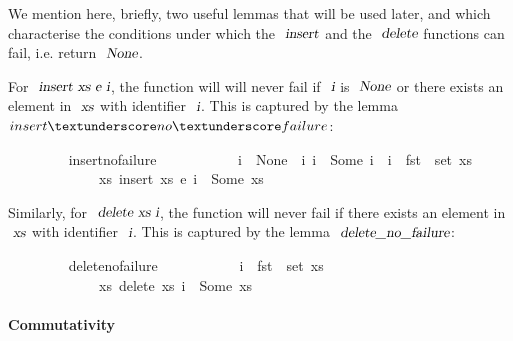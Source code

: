 \documentclass[acmlarge,review,anonymous]{acmart}\settopmatter{printfolios=true}
\begin{document}
We mention here, briefly, two useful lemmas that will be used later, and which characterise the conditions under which the $\isa{insert}$ and the $\isa{delete}$ functions can fail, i.e. return $\isa{None}$.

For $\isa{insert\ xs\ e\ i}$, the function will will never fail if $\isa{i}$ is $\isa{None}$ or there exists an element in $\isa{xs}$ with identifier $\isa{i}$.
This is captured by the lemma $insert{\isacharunderscore}no{\isacharunderscore}failure$:
\\
\begin{isabellebody}
\ \ \ \ \ \ \ \  insert{\isacharunderscore}no{\isacharunderscore}failure{\isacharcolon}\isanewline
\ \ \ \ \ \ \ \ \ \ \ {\isachardoublequoteopen}i\ {\isacharequal}\ None\ {\isasymor}\ {\isacharparenleft}{\isasymexists}i{\isacharprime}{\isachardot}\ i\ {\isacharequal}\ Some\ i{\isacharprime}\ {\isasymand}\ i{\isacharprime}\ {\isasymin}\ fst\ {\isacharbackquote}\ set\ xs{\isacharparenright}{\isachardoublequoteclose}\isanewline
\ \ \ \ \ \ \ \ \ \ \ \ \ {\isachardoublequoteopen}{\isasymexists}xs{\isacharprime}{\isachardot}\ insert\ xs\ e\ i\ {\isacharequal}\ Some\ xs{\isacharprime}{\isachardoublequoteclose}
\end{isabellebody}
\vspace{\baselineskip}
Similarly, for $\isa{delete\ xs\ i}$, the function will never fail if there exists an element in $\isa{xs}$ with identifier $\isa{i}$.
This is captured by the lemma $\isa{delete{\isacharunderscore}no{\isacharunderscore}failure}$:
\\
\begin{isabellebody}
\ \ \ \ \ \ \ \  delete{\isacharunderscore}no{\isacharunderscore}failure{\isacharcolon}\isanewline
\ \ \ \ \ \ \ \ \ \ \ {\isachardoublequoteopen}i\ {\isasymin}\ fst\ {\isacharbackquote}\ set\ xs{\isachardoublequoteclose}\isanewline
\ \ \ \ \ \ \ \ \ \ \ \ \ {\isachardoublequoteopen}{\isasymexists}xs{\isacharprime}{\isachardot}\ delete\ xs\ i\ {\isacharequal}\ Some\ xs{\isacharprime}{\isachardoublequoteclose}\isanewline
\end{isabellebody}

\paragraph{Commutativity}
\end{document}

